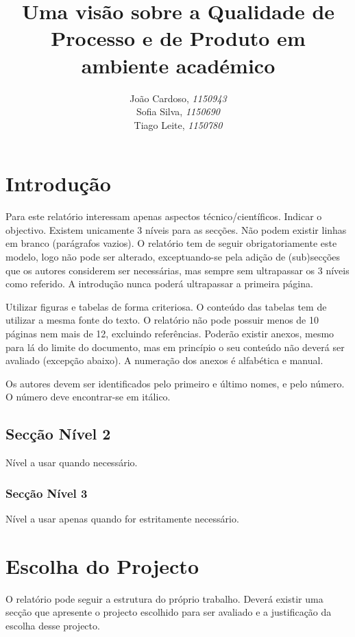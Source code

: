\documentclass[openany,10pt,a4paper]{article}
\begin{document}

\title{\textbf{Uma visão sobre a Qualidade de Processo e de Produto em ambiente académico}}
\author{João Cardoso, \textit{1150943} \\ Sofia Silva, \textit{1150690} \\ Tiago Leite, \textit{1150780}}
\date{}

\maketitle

\section{Introdução}

Para este relatório interessam apenas aspectos técnico/científicos. Indicar o objectivo. Existem unicamente 3 níveis para as secções. Não podem existir linhas em branco (parágrafos vazios). O relatório tem de seguir obrigatoriamente este modelo, logo não pode ser alterado, exceptuando-se pela adição de (sub)secções que os autores considerem ser necessárias, mas sempre sem ultrapassar os 3 níveis como referido. A introdução nunca poderá ultrapassar a primeira página.

Utilizar figuras e tabelas de forma criteriosa. O conteúdo das tabelas tem de utilizar a mesma fonte do texto. O relatório não pode possuir menos de 10 páginas nem mais de 12, excluindo referências. 
Poderão existir anexos, mesmo para lá do limite do documento, mas em princípio o seu conteúdo não deverá ser avaliado (excepção abaixo). A numeração dos anexos é alfabética e manual. 

Os autores devem ser identificados pelo primeiro e último nomes, e pelo número. O número deve encontrar-se em itálico.

\subsection{Secção Nível 2}
Nível a usar quando necessário.

\subsubsection{Secção Nível 3}
Nível a usar apenas quando for estritamente necessário.

\section{Escolha do Projecto}
O relatório pode seguir a estrutura do próprio trabalho. Deverá existir uma secção que apresente o projecto escolhido para ser avaliado e a justificação da escolha desse projecto.
\end{document}
